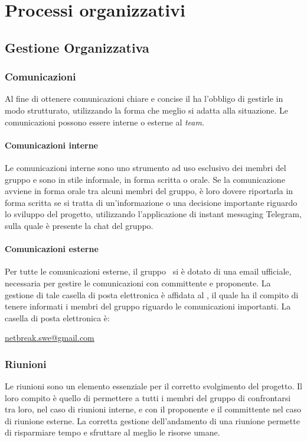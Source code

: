 \newpage

\section{Processi organizzativi}

	\subsection{Gestione Organizzativa}
		
		\subsubsection{Comunicazioni}
		Al fine di ottenere comunicazioni chiare e concise il \textit{\RdP} ha l'obbligo di gestirle in modo strutturato, utilizzando la forma che meglio si adatta alla situazione. Le comunicazioni possono essere interne o esterne al \textit{team}.
			
			\paragraph{Comunicazioni interne}
			Le comunicazioni interne sono uno strumento ad uso esclusivo dei membri del gruppo e sono in stile informale, in forma scritta o orale. 
			Se la comunicazione avviene in forma orale tra alcuni membri del gruppo, è loro dovere riportarla in forma scritta se si tratta di un'informazione o una decisione importante riguardo lo sviluppo del progetto, utilizzando l’applicazione di instant messaging\ped{G} Telegram, sulla quale è presente la chat del gruppo.

			\paragraph{Comunicazioni esterne}
			Per tutte le comunicazioni esterne, il gruppo \gruppo\ si è dotato di una email ufficiale, necessaria per gestire le comunicazioni con committente e proponente. La gestione di tale casella di posta elettronica è affidata al \textit{\RdP}, il quale ha il compito di tenere informati i membri del gruppo riguardo le comunicazioni importanti. La casella di posta elettronica è:
			\begin{center}
				\url{netbreak.swe@gmail.com} 
			\end{center}
			
		\subsubsection{Riunioni}
		Le riunioni sono un elemento essenziale per il corretto svolgimento del progetto. Il loro compito è quello di permettere a tutti i membri del gruppo di confrontarsi tra loro, nel caso di riunioni interne, e con il proponente e il committente nel caso di riunione esterne. La corretta gestione dell'andamento di una riunione permette di risparmiare tempo e sfruttare al meglio le risorse umane.
		
